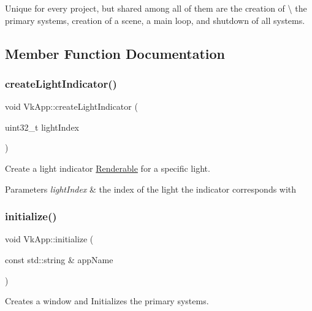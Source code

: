 Unique for every project, but shared among all of them are the creation of \textbackslash{} the primary systems, creation of a scene, a main loop, and shutdown of all systems. 

\subsection{Member Function Documentation}
\mbox{\label{class_vk_app_af1a2158abcf0fecfc795a4194a4d042c}} 
\subsubsection{\texorpdfstring{createLightIndicator()}{createLightIndicator()}}
{\footnotesize\ttfamily void Vk\+App\+::create\+Light\+Indicator (\begin{DoxyParamCaption}\item[{uint32\+\_\+t}]{light\+Index }\end{DoxyParamCaption})\hspace{0.3cm}{\ttfamily [private]}}



Create a light indicator \mbox{\hyperlink{class_renderable}{Renderable}} for a specific light. 


\begin{DoxyParams}{Parameters}
{\em light\+Index} & the index of the light the indicator corresponds with \\
\hline
\end{DoxyParams}
\mbox{\label{class_vk_app_af9b4dc5cc727da69f79669d47a514c5a}} 
\subsubsection{\texorpdfstring{initialize()}{initialize()}}
{\footnotesize\ttfamily void Vk\+App\+::initialize (\begin{DoxyParamCaption}\item[{const std\+::string \&}]{app\+Name }\end{DoxyParamCaption})\hspace{0.3cm}{\ttfamily [private]}}



Creates a window and Initializes the primary systems. 


